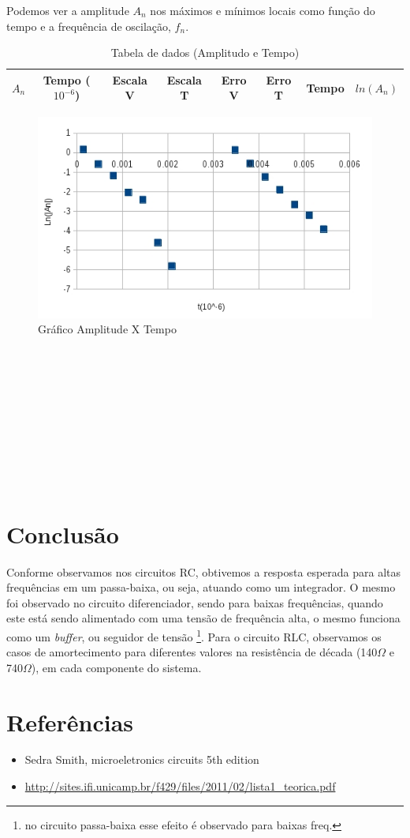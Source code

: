 \documentclass[12pt,letterpaper]{article}
\begin{document}
Podemos ver a amplitude $A_n$ nos máximos e mínimos locais como função do tempo e a frequência de oscilação, $f_n$.
\begin{table}
  \tiny
  \centering
  \begin{tabular}{|c|c|c|c|c|c|c|c|}
    \hline
    $A_n$ & Tempo ($10^{-6}$) & Escala V & Escala T & Erro V & Erro T & Tempo & $ln(A_n)$\\
    \hline
        
    \hline
  \end{tabular}
  \caption{Tabela de dados (Amplitudo e Tempo)}
\end{table}
\begin{figure}[!htb]
  \centering
  \label{mysub}
  \includegraphics[scale=0.50]{img/g1.jpg}
  \caption{Gráfico Amplitude X Tempo}
\end{figure}
\\
\\
\\
\\
\\
\\
\\
\\
\\

\section{Conclusão}
Conforme observamos nos circuitos RC, obtivemos a resposta esperada para altas frequências em um passa-baixa, ou seja, atuando como um integrador. O mesmo foi observado no circuito diferenciador, sendo para baixas frequências, quando este está sendo alimentado com uma tensão de frequência alta, o mesmo funciona como um \emph{buffer}, ou seguidor de tensão \footnote{no circuito passa-baixa esse efeito é observado para baixas freq.}.
Para o circuito RLC, observamos os casos de amortecimento para diferentes valores na resistência de década (140$\Omega$ e 740$\Omega$), em cada componente do sistema. 
\section{Referências}
\begin{itemize}
\item Sedra Smith, microeletronics circuits 5th edition
\item \url{http://sites.ifi.unicamp.br/f429/files/2011/02/lista1_teorica.pdf} 
\end{itemize}
\end{document}
